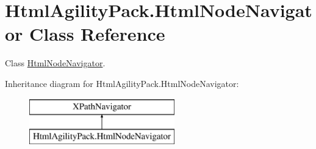 \hypertarget{class_html_agility_pack_1_1_html_node_navigator}{}\section{Html\+Agility\+Pack.\+Html\+Node\+Navigator Class Reference}
\label{class_html_agility_pack_1_1_html_node_navigator}


Class \hyperlink{class_html_agility_pack_1_1_html_node_navigator}{Html\+Node\+Navigator}.  


Inheritance diagram for Html\+Agility\+Pack.\+Html\+Node\+Navigator\+:\begin{figure}[H]
\begin{center}
\leavevmode
\includegraphics[height=2.000000cm]{class_html_agility_pack_1_1_html_node_navigator}
\end{center}
\end{figure}
